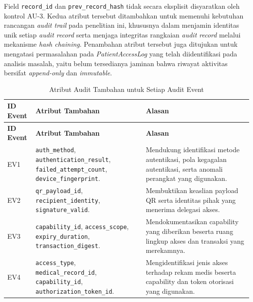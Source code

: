 Field \texttt{record\_id} dan \texttt{prev\_record\_hash} tidak secara eksplisit disyaratkan oleh kontrol AU-3. Kedua atribut tersebut ditambahkan untuk memenuhi kebutuhan rancangan \textit{audit trail} pada penelitian ini, khususnya dalam menjamin identitas unik setiap \textit{audit record} serta menjaga integritas rangkaian \textit{audit record} melalui mekanisme \textit{hash chaining}. Penambahan atribut tersebut juga ditujukan untuk mengatasi permasalahan pada \textit{PatientAccessLog} yang telah diidentifikasi pada analisis masalah, yaitu belum tersedianya jaminan bahwa riwayat aktivitas bersifat \textit{append-only} dan \textit{immutable}.

\begin{xltabular}
{\textwidth}
{|>{\centering\arraybackslash}p{1.2cm}|X|>{\raggedright\arraybackslash}p{5.2cm}|}

\caption{Atribut Audit Tambahan untuk Setiap Audit Event}
\label{tab:detail-audit-record}\\

\hline
\textbf{ID Event} &
\textbf{Atribut Tambahan} &
\textbf{Alasan} \\
\hline
\endfirsthead

\hline
\textbf{ID Event} &
\textbf{Atribut Tambahan} &
\textbf{Alasan} \\
\hline
\endhead

\hline
\endfoot

\hline
\endlastfoot

EV1 &
\texttt{auth\_method}, \texttt{authentication\_result}, \texttt{failed\_attempt\_count}, \texttt{device\_fingerprint}. &
Mendukung identifikasi metode autentikasi, pola kegagalan autentikasi, serta anomali perangkat yang digunakan. \\
\hline

EV2 &
\texttt{qr\_payload\_id}, \texttt{recipient\_identity}, \texttt{signature\_valid}. &
Membuktikan keaslian payload QR serta identitas pihak yang menerima delegasi akses. \\
\hline

EV3 &
\texttt{capability\_id}, \texttt{access\_scope}, \texttt{expiry\_duration}, \texttt{transaction\_digest}. &
Mendokumentasikan capability yang diberikan beserta ruang lingkup akses dan transaksi yang merekamnya. \\
\hline

EV4 &
\texttt{access\_type}, \texttt{medical\_record\_id}, \texttt{capability\_id}, \texttt{authorization\_token\_id}. &
Mengidentifikasi jenis akses terhadap rekam medis beserta capability dan token otorisasi yang digunakan. \\
\hline


\end{xltabular}
